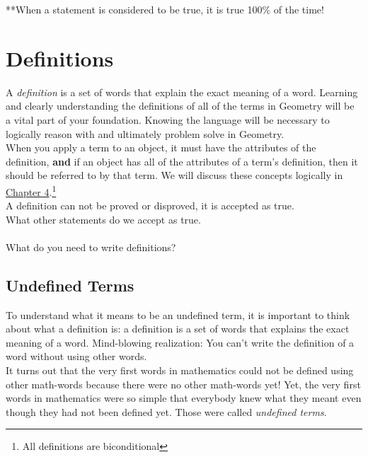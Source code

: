 **When a statement is considered to be true, it is true 100\% of the time!

			\section{Definitions}

A \emph{definition} is a set of words that explain the exact meaning of a word.  Learning and clearly understanding the definitions of all of the terms in Geometry will be a vital part of your foundation.  Knowing the language will be necessary to logically reason with and ultimately problem solve in Geometry.\\

When you apply a term to an object, it must have the attributes of the definition, \textbf{and} if an object has all of the attributes of a term's definition, then it should be referred to by that term.  We will discuss these concepts logically in \hyperlink{sec:def-are-biconditional}{Chapter 4}.\footnote{All definitions are biconditional}\\

\noindent A definition can not be proved or disproved, it is accepted as true.\\
\noindent \q What other statements do we accept as true.\\
\\
\noindent\q What do you need to write definitions?\\

\subsection{Undefined Terms}

To understand what it means to be an undefined term, it is important to think about what a definition is:  a definition is a set of words that explains the exact meaning of a word.  Mind-blowing realization:  You can't write the definition of a word without using other words.\\

It turns out that the very first words in mathematics could not be defined using other math-words because there were no other math-words yet!  Yet, the very first words in mathematics were so simple that everybody knew what they meant even though they had not been defined yet.  Those were called \emph{undefined terms}.\\

